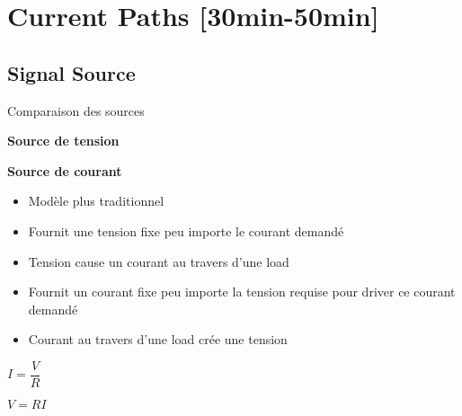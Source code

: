 
\section[Level 2]{Current Paths [30min-50min]}


\subsection[2min-Pascal]{Signal Source }
\begin{frame}{Comparaison des sources}
    \begin{twocolumns}
        \leftcol
        \begin{center}
            \textbf{Source de tension}
        \end{center}
        \rightcol
        \begin{center}
            \textbf{Source de courant}
        \end{center}
    \end{twocolumns}

    \begin{twocolumns}[0.55]
        \leftcol
        \begin{itemize}
            \item Modèle plus traditionnel
            \item Fournit une tension fixe peu importe le courant demandé
            \item Tension cause un courant au travers d'une load
        \end{itemize}

        \rightcol
        \begin{itemize}
            \item Fournit un courant fixe peu importe la tension requise pour driver ce courant demandé
            \item Courant au travers d'une load crée une tension
        \end{itemize}
        
    \end{twocolumns}

    \vspace{-8pt}
    \begin{twocolumns}
        \leftcol
        \begin{center}
            $I = \dfrac{V}{R}$
        \end{center}
        \rightcol
        \begin{center}
            $V = RI$
        \end{center}
    \end{twocolumns}


\end{frame}
